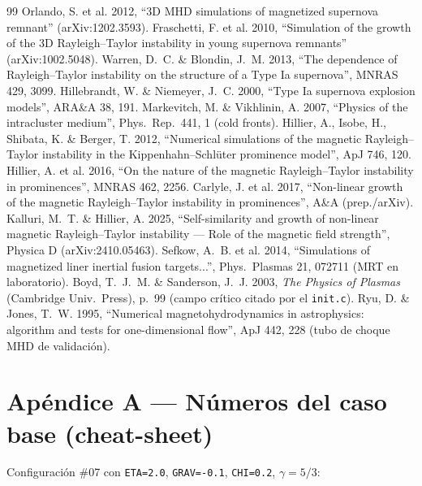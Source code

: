 \documentclass[11pt,a4paper]{article}
\newcommand{\code}[1]{\texttt{#1}}
\begin{document}
\begin{thebibliography}{99}
 Orlando, S. et al. 2012, ``3D MHD simulations of magnetized supernova remnant'' (arXiv:1202.3593).
 Fraschetti, F. et al. 2010, ``Simulation of the growth of the 3D Rayleigh--Taylor instability in young supernova remnants'' (arXiv:1002.5048).
 Warren, D.~C. \& Blondin, J.~M. 2013, ``The dependence of Rayleigh--Taylor instability on the structure of a Type Ia supernova'', MNRAS 429, 3099.
 Hillebrandt, W. \& Niemeyer, J.~C. 2000, ``Type Ia supernova explosion models'', ARA\&A 38, 191.
 Markevitch, M. \& Vikhlinin, A. 2007, ``Physics of the intracluster medium'', Phys.\ Rep.\ 441, 1 (cold fronts).
 Hillier, A., Isobe, H., Shibata, K. \& Berger, T. 2012, ``Numerical simulations of the magnetic Rayleigh--Taylor instability in the Kippenhahn--Schl\"uter prominence model'', ApJ 746, 120.
 Hillier, A. et al. 2016, ``On the nature of the magnetic Rayleigh--Taylor instability in prominences'', MNRAS 462, 2256.
 Carlyle, J. et al. 2017, ``Non-linear growth of the magnetic Rayleigh--Taylor instability in prominences'', A\&A (prep./arXiv).
 Kalluri, M.~T. \& Hillier, A. 2025, ``Self-similarity and growth of non-linear magnetic Rayleigh--Taylor instability --- Role of the magnetic field strength'', Physica D (arXiv:2410.05463).
 Sefkow, A.~B. et al. 2014, ``Simulations of magnetized liner inertial fusion targets...'', Phys.\ Plasmas 21, 072711 (MRT en laboratorio).
 Boyd, T.~J.~M. \& Sanderson, J.~J. 2003, \emph{The Physics of Plasmas} (Cambridge Univ.\ Press), p.~99 (campo crítico citado por el \code{init.c}).
 Ryu, D. \& Jones, T.~W. 1995, ``Numerical magnetohydrodynamics in astrophysics: algorithm and tests for one-dimensional flow'', ApJ 442, 228 (tubo de choque MHD de validación).

\end{thebibliography}

\clearpage
\appendix

\section{Apéndice A — Números del caso base (cheat-sheet)}
\label{app:numeros}

Configuración \#07 con \code{ETA=2.0}, \code{GRAV=-0.1}, \code{CHI=0.2}, $\gamma=5/3$:
\end{document}
